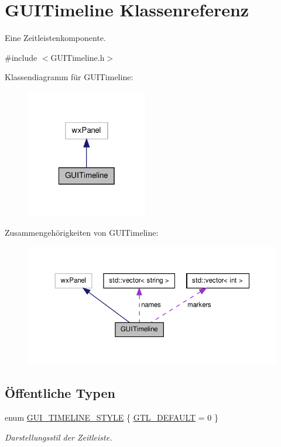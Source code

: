 \hypertarget{classGUITimeline}{\section{G\-U\-I\-Timeline Klassenreferenz}
\label{classGUITimeline}
}


Eine Zeitleistenkomponente.  




{\ttfamily \#include $<$G\-U\-I\-Timeline.\-h$>$}



Klassendiagramm für G\-U\-I\-Timeline\-:\nopagebreak
\begin{figure}[H]
\begin{center}
\leavevmode
\includegraphics[width=150pt]{classGUITimeline__inherit__graph}
\end{center}
\end{figure}


Zusammengehörigkeiten von G\-U\-I\-Timeline\-:\nopagebreak
\begin{figure}[H]
\begin{center}
\leavevmode
\includegraphics[width=350pt]{classGUITimeline__coll__graph}
\end{center}
\end{figure}
\subsection*{Öffentliche Typen}
\begin{DoxyCompactItemize}
\item 
enum \hyperlink{classGUITimeline_a56f1cf170a8c077a0b94d19a0eba8c94}{G\-U\-I\-\_\-\-T\-I\-M\-E\-L\-I\-N\-E\-\_\-\-S\-T\-Y\-L\-E} \{ \hyperlink{classGUITimeline_a56f1cf170a8c077a0b94d19a0eba8c94a9c676c8ba0c3c3312938d34a8e855bb1}{G\-T\-L\-\_\-\-D\-E\-F\-A\-U\-L\-T} = 0
 \}
\begin{DoxyCompactList}\small\item\em Darstellungsstil der Zeitleiste. \end{DoxyCompactList}\end{DoxyCompactItemize}
